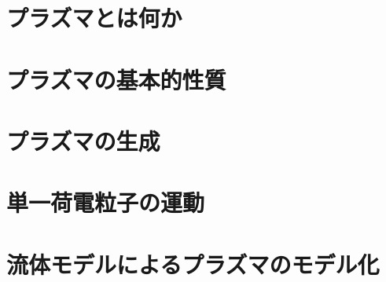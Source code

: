 \documentclass{report}
\begin{document}
  \maketitle
  \tableofcontents
  \setcounter{chapter}{-1}
  \chapter{プラズマとは何か}
    
  \chapter{プラズマの基本的性質}
    
  \chapter{プラズマの生成}
    
  \chapter{単一荷電粒子の運動}
    
  \chapter{流体モデルによるプラズマのモデル化}
    

    \printindex
\end{document}
